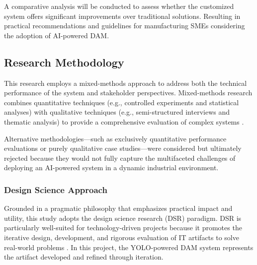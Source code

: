 \documentclass[a4paper,10pt,twocolumn]{article}
\numberwithin{figure}{section}
\numberwithin{table}{section}
\begin{document}
A comparative analysis will be conducted to assess whether the customized 
system offers significant improvements over traditional solutions. 
Resulting in practical recommendations 
and guidelines for manufacturing SMEs 
considering the adoption of AI-powered DAM.


\subsection{Research Methodology}
This research employs a mixed-methods approach to address both the 
technical performance of the system and stakeholder perspectives. 
Mixed-methods research combines quantitative techniques 
(e.g., controlled experiments and statistical analyses) with 
qualitative techniques (e.g., semi-structured interviews and thematic analysis)
to provide a comprehensive evaluation of complex systems \citep{johnson2004mixed}.

Alternative methodologies—such as exclusively quantitative performance evaluations 
or purely qualitative case studies—were considered but ultimately rejected because 
they would not fully capture the multifaceted challenges of deploying an AI-powered 
system in a dynamic industrial environment.

\vspace{0.3cm}
\subsubsection{Design Science Approach}
\vspace{0.3cm}


Grounded in a pragmatic philosophy that emphasizes practical impact and utility, 
this study adopts the design science research (DSR) paradigm. DSR is particularly 
well-suited for technology-driven projects because it promotes the iterative design, 
development, and rigorous evaluation of IT artifacts to solve 
real-world problems \citep{hevner2004design}. In this project, 
the YOLO-powered DAM system represents 
the artifact developed and refined through iteration.
\end{document}
